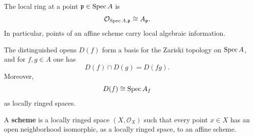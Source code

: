 \documentclass[12pt]{article}
\begin{document}
The local ring at a point $\mathfrak p\in \operatorname{Spec} A$ is
\[
    \mathcal O_{\operatorname{Spec} A,\mathfrak p} \cong A_{\mathfrak p}.
\]
In particular, points of an affine scheme carry local algebraic information.

\begin{proposition}
    The distinguished opens $D(f)$ form a basis for the Zariski topology on $\operatorname{Spec} A$, and for $f,g\in A$ one has
    \[
        D(f)\cap D(g)=D(fg).
    \]
    Moreover,
    \[
        D(f)\cong \operatorname{Spec} A_f
    \]
    as locally ringed spaces.
\end{proposition}


\begin{definition}
    A \textbf{scheme} is a locally ringed space $(X,\mathcal O_X)$ such that every point $x\in X$ has an open neighborhood isomorphic, as a locally ringed space, to an affine scheme.
\end{definition}
\end{document}
